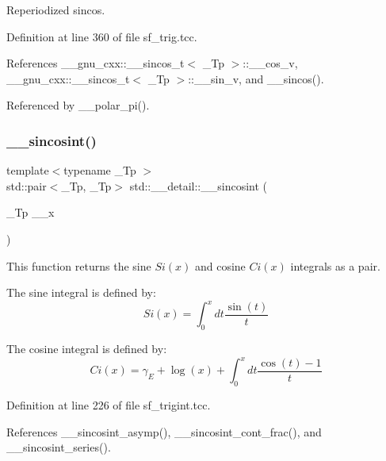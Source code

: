 Reperiodized sincos. 

Definition at line 360 of file sf\+\_\+trig.\+tcc.



References \+\_\+\+\_\+gnu\+\_\+cxx\+::\+\_\+\+\_\+sincos\+\_\+t$<$ \+\_\+\+Tp $>$\+::\+\_\+\+\_\+cos\+\_\+v, \+\_\+\+\_\+gnu\+\_\+cxx\+::\+\_\+\+\_\+sincos\+\_\+t$<$ \+\_\+\+Tp $>$\+::\+\_\+\+\_\+sin\+\_\+v, and \+\_\+\+\_\+sincos().



Referenced by \+\_\+\+\_\+polar\+\_\+pi().

\mbox{\label{namespacestd_1_1____detail_a53bf807a99eef68cdb6f917c7ca085bf}} 
\subsubsection{\texorpdfstring{\+\_\+\+\_\+sincosint()}{\_\_sincosint()}}
{\footnotesize\ttfamily template$<$typename \+\_\+\+Tp $>$ \\
std\+::pair$<$\+\_\+\+Tp, \+\_\+\+Tp$>$ std\+::\+\_\+\+\_\+detail\+::\+\_\+\+\_\+sincosint (\begin{DoxyParamCaption}\item[{\+\_\+\+Tp}]{\+\_\+\+\_\+x }\end{DoxyParamCaption})}



This function returns the sine $ Si(x) $ and cosine $ Ci(x) $ integrals as a {\ttfamily pair}. 

The sine integral is defined by\+: \[ Si(x) = \int_0^x dt \frac{\sin(t)}{t} \]

The cosine integral is defined by\+: \[ Ci(x) = \gamma_E + \log(x) + \int_0^x dt \frac{\cos(t) - 1}{t} \] 

Definition at line 226 of file sf\+\_\+trigint.\+tcc.



References \+\_\+\+\_\+sincosint\+\_\+asymp(), \+\_\+\+\_\+sincosint\+\_\+cont\+\_\+frac(), and \+\_\+\+\_\+sincosint\+\_\+series().

\mbox{\label{namespacestd_1_1____detail_a976c3ff52c54001de3d409900c9bcb9c}} 
